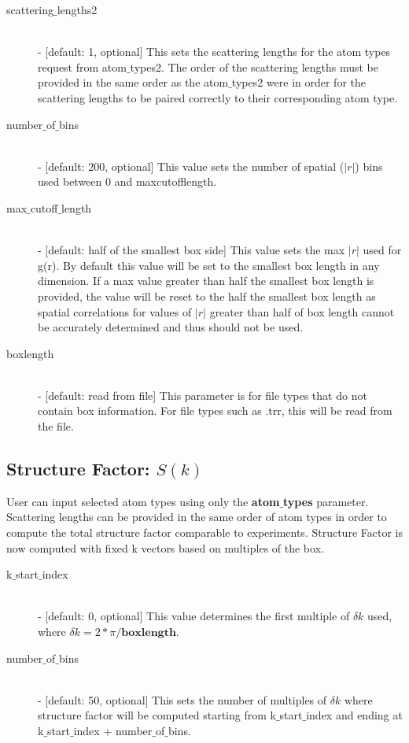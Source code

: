 \documentclass{article}
\begin{document}
\begin{description}
	\item[scattering$\_$lengths2] \hfill \\
	- [default: 1, optional] This sets the scattering lengths for the atom types request from atom$\_$types2.  The order of the scattering lengths must be provided in the same order as the atom$\_$types2 were in order for the scattering lengths to be paired correctly to their corresponding atom type. 
	
	\item[number$\_$of$\_$bins] \hfill \\
	- [default: 200, optional] This value sets the number of spatial ($|r|$) bins used between 0 and maxcutofflength.
	
	\item[max$\_$cutoff$\_$length] \hfill \\
	- [default: half of the smallest box side] This value sets the max $|r|$ used for g(r).  By default this value will be set to the smallest box length in any dimension.  If a max value greater than half the smallest box length is provided, the value will be reset to the half the smallest box length as spatial correlations for values of $|r|$ greater than half of box length cannot be accurately determined and thus should not be used.
	
	\item[boxlength] \hfill \\
	- [default: read from file] This parameter is for file types that do not contain box information. For file types such as .trr, this will be read from the file. 
	
\end{description}


\subsection{Structure Factor: $S(k)$} \label{sec::sofk_parm}
User can input selected atom types using only the \textbf{atom$\_$types} parameter.  Scattering lengths can be provided in the same order of atom types in order to compute the total structure factor comparable to experiments. Structure Factor is now computed with fixed k vectors based on multiples of the box.
\begin{description}		
	\item[k$\_$start$\_$index] \hfill \\
	- [default: 0, optional] This value determines the first multiple of $\delta k$ used, where $\delta k = 2*\pi/\textbf{boxlength}$.  
		
	\item[number$\_$of$\_$bins] \hfill \\
	- [default: 50, optional] This sets the number of multiples of $\delta k$ where structure factor will be computed starting from k$\_$start$\_$index and ending at k$\_$start$\_$index + number$\_$of$\_$bins.  

\end{description}
\end{document}
